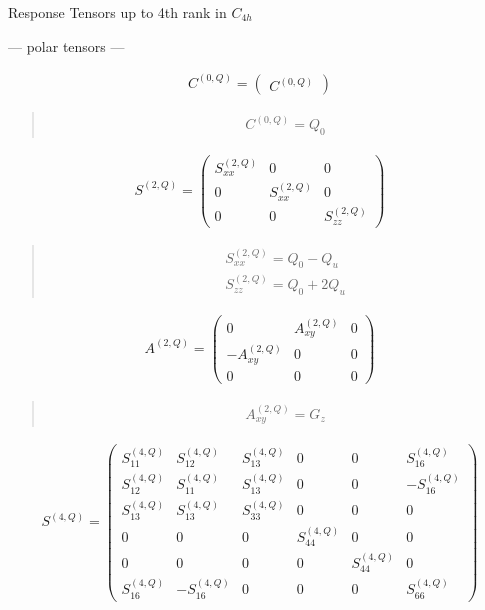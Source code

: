 \documentclass[fleqn,10pt]{jsarticle}
\begin{document}
\setcounter{MaxMatrixCols}{16}

\begin{center}
\LARGE
Response Tensors up to 4th rank in $C_{4h}$
\end{center}
\begin{center}\LARGE --- polar tensors ---\end{center}
\begin{align*}
C^{(0,Q)} = \begin{pmatrix} C^{(0,Q)} \end{pmatrix}
\end{align*}
\begin{quote}
\begin{align*}
& C^{(0,Q)} = Q_{0}
\end{align*}
\end{quote}
\begin{align*}
S^{(2,Q)} = \begin{pmatrix} S^{(2,Q)}_{xx} & 0 & 0 \\ 0 & S^{(2,Q)}_{xx} & 0 \\ 0 & 0 & S^{(2,Q)}_{zz} \end{pmatrix}
\end{align*}
\begin{quote}
\begin{align*}
& S^{(2,Q)}_{xx} = Q_{0} - Q_{u} \\
& S^{(2,Q)}_{zz} = Q_{0} + 2 Q_{u}
\end{align*}
\end{quote}
\begin{align*}
A^{(2,Q)} = \begin{pmatrix} 0 & A^{(2,Q)}_{xy} & 0 \\ - A^{(2,Q)}_{xy} & 0 & 0 \\ 0 & 0 & 0 \end{pmatrix}
\end{align*}
\begin{quote}
\begin{align*}
& A^{(2,Q)}_{xy} = G_{z}
\end{align*}
\end{quote}
\begin{align*}
S^{(4,Q)} = \begin{pmatrix} S^{(4,Q)}_{11} & S^{(4,Q)}_{12} & S^{(4,Q)}_{13} & 0 & 0 & S^{(4,Q)}_{16} \\ S^{(4,Q)}_{12} & S^{(4,Q)}_{11} & S^{(4,Q)}_{13} & 0 & 0 & - S^{(4,Q)}_{16} \\ S^{(4,Q)}_{13} & S^{(4,Q)}_{13} & S^{(4,Q)}_{33} & 0 & 0 & 0 \\ 0 & 0 & 0 & S^{(4,Q)}_{44} & 0 & 0 \\ 0 & 0 & 0 & 0 & S^{(4,Q)}_{44} & 0 \\ S^{(4,Q)}_{16} & - S^{(4,Q)}_{16} & 0 & 0 & 0 & S^{(4,Q)}_{66} \end{pmatrix}
\end{align*}
\end{document}
